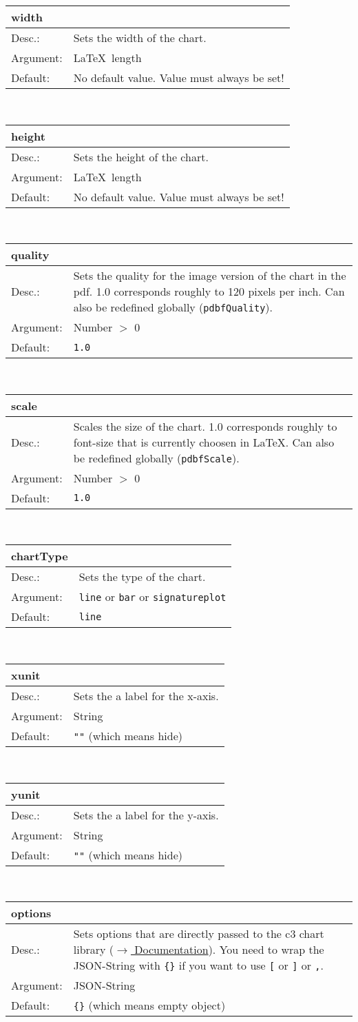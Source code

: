 \documentclass[11pt]{scrartcl}
\def\a{5cm}
\def\b{10.5cm}
\def\option#1#2#3#4{%
\noindent \begin{tabular}{|p{\a}|p{\b}|}
\hline
\textbf{#1} & \\
\hline
Desc.: & #2 \\
\hline
Argument: & #3\\
\hline
Default:& #4\\
\hline
\end{tabular} \\[4pt]%
}
\begin{document}
\option
{width}
{Sets the width of the chart.}
{\LaTeX~length}
{No default value. Value must always be set!}

\option
{height}
{Sets the height of the chart.}
{\LaTeX~length}
{No default value. Value must always be set!}

\option
{quality}
{Sets the quality for the image version of the chart in the pdf. 1.0 corresponds roughly to 120 pixels per inch. Can also be redefined globally (\texttt{pdbfQuality}).}
{Number $>$ 0}
{\texttt{1.0}}

\option
{scale}
{Scales the size of the chart. 1.0 corresponds roughly to font-size that is currently choosen in \LaTeX. Can also be redefined globally (\texttt{pdbfScale}).}
{Number $>$ 0}
{\texttt{1.0}}

\option
{chartType}
{Sets the type of the chart.}
{\texttt{line} or \texttt{bar} or \texttt{signatureplot}}
{\texttt{line}}

\option
{xunit}
{Sets the a label for the x-axis.}
{String}
{\texttt{""} (which means hide)}

\option
{yunit}
{Sets the a label for the y-axis.}
{String}
{\texttt{""} (which means hide)}

\option
{options}
{Sets options that are directly passed to the c3 chart library (\href{http://c3js.org/reference.html}{$\rightarrow$ Documentation}). You need to wrap the JSON-String with \texttt{\{\}} if you want to use \texttt{[} or \texttt{]} or \texttt{,}.}
{JSON-String}
{\texttt{\{\}} (which means empty object)}

%
%
%
%
%
%
\end{document}
